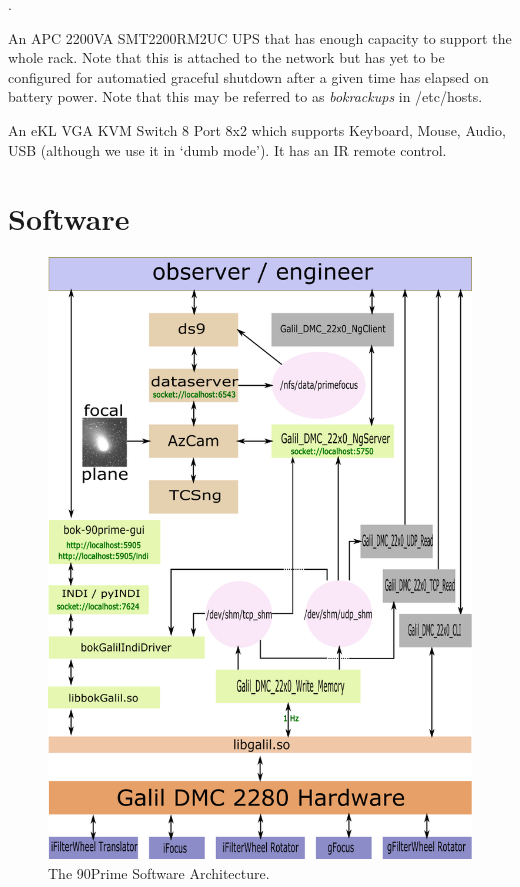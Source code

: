 \documentclass[12pt,twoside]{article}
\begin{document}
\begin{description}
              .
\item[\sfmagenta{bokups}] An APC 2200VA SMT2200RM2UC UPS that has enough capacity to support the whole rack. Note that this is
              attached to the network but has yet to be configured for automatied graceful shutdown after a given time has
              elapsed on battery power. Note that this may be referred to as \emph{bokrackups} in /etc/hosts.
\item[\sfmagenta{bokkvm}] An eKL VGA KVM Switch 8 Port 8x2 which supports Keyboard, Mouse, Audio, USB (although we use it in
              `dumb mode'). It has an IR remote control.
\end{description}

\section{Software}
\label{Software}

\begin{figure}
 \centering
 \includegraphics[angle=0,scale=0.75]{bokGalilIndiDriver.png}
 \caption{The 90Prime Software Architecture.}
 \label{bokGalilIndiDriver}
\end{figure}
\end{document}
